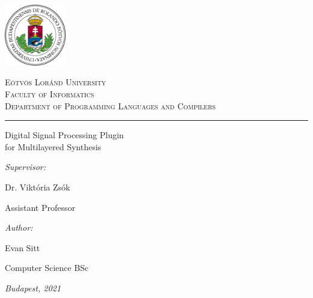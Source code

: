 \begin{titlepage}

\noindent
\parbox[m]{0.2\textwidth}{
 \includegraphics[width=0.2\textwidth]{elte_logo_color.eps} %
}
\hfill
\parbox[m]{0.7\textwidth}{
\begin{center}
\begin{large}
\textsc{
E\"otv\"os Lor\'and University\\
\vspace{0.5pc}
Faculty of Informatics\\
\vspace{0.5pc}
Department of Programming Languages and Compilers\\
}
\end{large}
\end{center}
}

\vspace{1pc}
\hrule

\vfill

\begin{center}
{\LARGE Digital Signal Processing Plugin\\for Multilayered Synthesis}
\end{center}

\vfill

\noindent
\hspace*{0.05\textwidth}
\parbox{0.45\textwidth}{
{\it Supervisor:}
\bigskip

{\Large Dr. Vikt\'oria Zs\'ok}
\smallskip

Assistant Professor
}
\hfill
\parbox{0.45\textwidth}{
{\it Author:}
\bigskip

{\Large Evan Sitt}
\smallskip

Computer Science BSc
}


\vfill

\begin{center}
{\large {\it Budapest, 2021}}
\end{center}

\end{titlepage}
